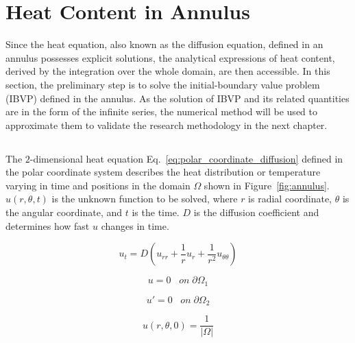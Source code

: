 
\section{Heat Content in Annulus}

Since the heat equation, also known as the diffusion equation, defined
in an annulus possesses explicit solutions, the analytical expressions
of heat content, derived by the integration over the whole domain, are
then accessible. In this section, the preliminary step is to solve the
initial-boundary value problem (IBVP) defined in the annulus. As the
solution of IBVP and its related quantities are in the form of the
infinite series, the numerical method will be used to approximate them
to validate the research methodology in the next chapter.


\subsection{}\label{analytical results}

The $2$-dimensional heat equation \cite{crank1979mathematics}
Eq.~\ref{eq:polar_coordinate_diffusion} defined in the polar
coordinate system describes the heat distribution or temperature
varying in time and positions in the domain $\Omega$ shown in
Figure~\ref{fig:annulus}. $u(r, \theta, t)$ is the unknown function to
be solved, where $r$ is radial coordinate, $\theta$ is the angular
coordinate, and $t$ is the time. $D$ is the diffusion coefficient and
determines how fast $u$ changes in time.

\begin{equation}\label{eq:polar_coordinate_diffusion}
  u_t = D(u_{rr} + \frac{1}{r} u_r + \frac{1}{r^2} u_{\theta\theta})
\end{equation}

\begin{equation}\label{eq:Dirichlet_bc}
  u = 0 \; \; \; on \; \partial \Omega_1
\end{equation}

\begin{equation}\label{eq:Neumann_bc}
  u' = 0 \; \; \; on \; \partial \Omega_2
\end{equation}


\begin{equation}\label{eq:initial_bc}
  u(r, \theta, 0) = \frac{1}{|\Omega|}
\end{equation}

